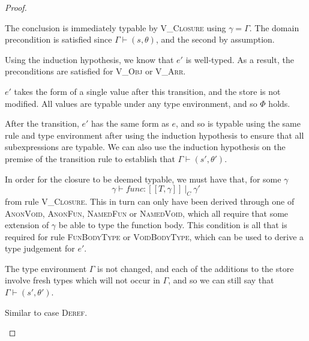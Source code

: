 \begin{proof}
  \begin{case}[Func]

	The conclusion is immediately typable by \textsc{V\_Closure} using $\gamma=\Gamma$. The domain
	precondition is satisfied since $\Gamma\vdash(s,\theta)$, and the second by assumption.
  \end{case}
  \begin{case}
	Using the induction hypothesis, we know that $e'$ is well-typed. As a result,
	the preconditions are satisfied for \textsc{V\_Obj} or \textsc{V\_Arr}.
  \end{case}
  \begin{case}
	$e'$ takes the form of a single value after this transition, and the store
	is not modified. All values are typable under any type environment, and
	so $\Phi$ holds.
  \end{case}
  \begin{case}
	After the transition, $e'$ has the same form as $e$, and so 
	is typable using the same rule and type environment after using the induction
	hypothesis to ensure that all subexpressions are typable. We can also use 
	the induction hypothesis on the premise of the transition rule to
	establish that $\Gamma\vdash(s',\theta')$.
  \end{case}
  \begin{case}
	In order for the closure to be deemed typable, we must have that, for some $\gamma$
	$$\gamma\vdash func:[\![T,\gamma]\!]\ |_C\ \gamma'$$
	from rule \textsc{V\_Closure}. This in turn can only have been derived through 
	one of \textsc{AnonVoid}, \textsc{AnonFun}, \textsc{NamedFun} or \textsc{NamedVoid},
	which all require that some extension of $\gamma$ be able to type the function body.
	This condition is all that is required for rule \textsc{FunBodyType} or \textsc{VoidBodyType},
	which can be used to derive a type judgement for $e'$.

	The type environment $\Gamma$ is not changed, and each of the additions to the store
	involve fresh types which will not occur in $\Gamma$, and so we can still say 
	that $\Gamma\vdash(s',\theta')$.
  \end{case}
  \begin{case}
	Similar to case \textsc{Deref}.
  \end{case}
  \begin{case}[Assign3]


\end{case}
\end{proof}
